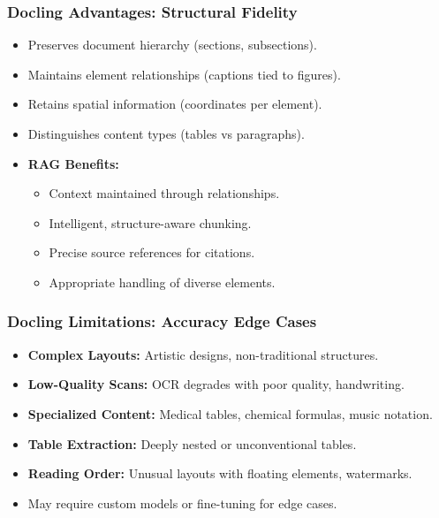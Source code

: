 \begin{frame}[fragile]\frametitle{Docling Advantages: Structural Fidelity}
      \begin{itemize}
        \item Preserves document hierarchy (sections, subsections).
        \item Maintains element relationships (captions tied to figures).
        \item Retains spatial information (coordinates per element).
        \item Distinguishes content types (tables vs paragraphs).
        \item \textbf{RAG Benefits:}
        \begin{itemize}
          \item Context maintained through relationships.
          \item Intelligent, structure-aware chunking.
          \item Precise source references for citations.
          \item Appropriate handling of diverse elements.
        \end{itemize}
      \end{itemize}
\end{frame}

\begin{frame}[fragile]\frametitle{Docling Limitations: Accuracy Edge Cases}
      \begin{itemize}
        \item \textbf{Complex Layouts:} Artistic designs, non-traditional structures.
        \item \textbf{Low-Quality Scans:} OCR degrades with poor quality, handwriting.
        \item \textbf{Specialized Content:} Medical tables, chemical formulas, music notation.
        \item \textbf{Table Extraction:} Deeply nested or unconventional tables.
        \item \textbf{Reading Order:} Unusual layouts with floating elements, watermarks.
        \item May require custom models or fine-tuning for edge cases.
      \end{itemize}
\end{frame}

